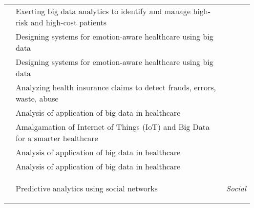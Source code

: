 \begin{center}
\begin{longtable}{|p{4cm}|p{8cm}|p{1cm}|}
        \cite{Bates2014}           & Exerting big data analytics to identify and manage high-risk and high-cost patients                                                           &                                             \\

        \cite{Lin2016}             & Designing systems for emotion-aware healthcare using big data                                                                                 &                                             \\

        \cite{Lin2016}             & Designing systems for emotion-aware healthcare using big data                                                                                 &                                             \\

        \cite{Srinivasan2013}      & Analyzing health insurance claims to detect frauds, errors, waste, abuse                                                                      &                                             \\

        \cite{Mehta2018}           & Analysis of application of big data in healthcare                                                                                             &                                             \\

        \cite{firouzi2018internet} & Amalgamation of Internet of Things (IoT) and Big Data for a smarter healthcare                                                                &                                             \\

        \cite{firouzi2018internet} & Analysis of application of big data in healthcare                                                                                             &                                             \\

        \cite{Chen2018}            & Analysis of application of big data in healthcare                                                                                             &                                             \\

        \hline
        \cite{asur2010predicting}  & Predictive analytics using social networks                                                                                                    & \multirow{8}{*}{\begin{turn}{-90} \textit{Social} \end{turn}}  \\


\end{longtable}
\end{center}
